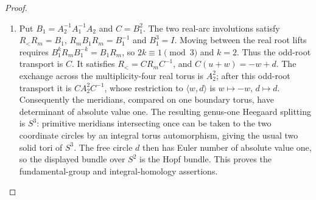 \begin{proof}
\begin{enumerate}[label=\arabic*.,leftmargin=*]
\item  Put
$B_1=A_2^{-1}A_1^{-1}A_2$ and $C=B_1^2$. The two real-arc involutions
satisfy $R_<R_m=B_1$, $R_mB_1R_m=B_1^{-1}$ and $B_1^3=I$.
Moving between the real root lifts requires
$B_1^kR_mB_1^{-k}=B_1R_m$, so $2k\equiv1\pmod3$ and $k=2$.
Thus the odd-root transport is $C$. It satisfies $R_<=CR_mC^{-1}$, and
$C(u+w)=-w+d$. The exchange across the multiplicity-four real torus
is $A_2^2$; after this odd-root transport it is
$CA_2^2C^{-1}$, whose restriction to $\langle w,d\rangle$ is
$w\mapsto-w$, $d\mapsto d$. Consequently the meridians, compared on
one boundary torus, have determinant of absolute value one. The
resulting genus-one Heegaard splitting is $S^3$: primitive meridians
intersecting once can be taken to the two coordinate circles by an
integral torus automorphism, giving the usual two solid tori of $S^3$.
The free circle $d$ then has Euler number of absolute value one, so
the displayed bundle over $S^2$ is the Hopf bundle. This proves the
fundamental-group and integral-homology assertions.
\end{enumerate}
\end{proof}
